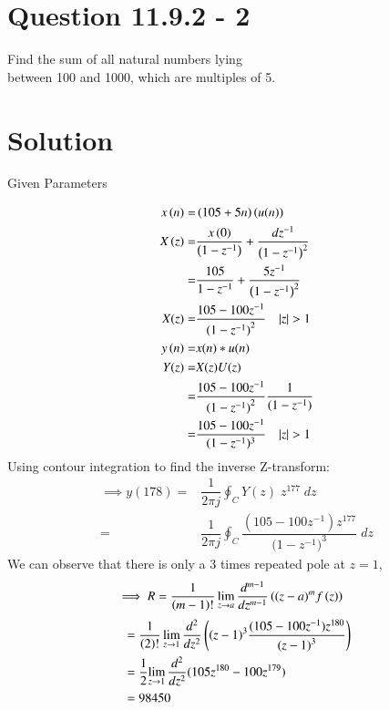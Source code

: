 \documentclass[journal,12pt,twocolumn]{IEEEtran}
\theoremstyle{remark}
\begin{document}
\section{Question 11.9.2 - 2} Find the sum of all natural numbers lying\\ between 100 and 1000, which are
multiples of 5.
\section{Solution}
\begin{table}[!h]
	\centering
	
	\vspace{6 pt}
	\caption{Given Parameters}
	\label{tab:enter-label}
\end{table}
\begin{align}
	x\brak{n}= & \brak{105+5n}\brak{u(n)}\\
X\brak{z}= &\frac {x\brak{0}} {\brak{1-z^{-1}}} + \frac {dz^{-1}} {\brak{1-z^{-1}}^2} \\
= &\dfrac{105}{1-z^{-1}} + \frac{5z^{-1}}{\brak{1-z^{-1}}^{2}}\\
X(z)=& \dfrac{105-100z^{-1}}{{(1-z^{-1})}^2} \quad |z|>1\\
y\brak{n}=& x(n)* u(n)\\
Y(z)=& X(z)U(z) \\
=& \dfrac{105-100z^{-1}}{{(1-z^{-1})}^2}\frac1 {(1-z^{-1})} \\
=& \dfrac{105-100z^{-1}}{(1-z^{-1})^{3}} \quad |z|>1
\end{align}
Using contour integration to find the inverse Z-transform:\\
\begin{align}
    \implies y(178)=&\dfrac{1}{2\pi j}\oint_{C}Y(z) \;z^{177} \;dz\\
    =&\dfrac{1}{2\pi j}\oint_{C}\dfrac{(105-100z^{-1}){z^{177}}}{({1-z^{-1})}^{3}} \;dz 
\end{align}
We can observe that there is only a 3 times repeated pole at $z=1$,
\begin{align}
    \implies R&=\dfrac{1}{\left(m-1\right)!}\lim\limits_{z\to a}\dfrac{d^{m-1}}{dz^{m-1}}\left({(z-a)}^{m}f\left(z\right)\right)  
\end{align}
\begin{align}
    &=\dfrac{1}{\left(2\right)!}\lim\limits_{z\to 1}\dfrac{d^{2}}{dz^{2}}\left({(z-1)}^{3}\dfrac{(105-100z^{-1})z^{180}}{{(z-1)}^3}\right)\\
    &=\dfrac{1}{2}{\lim\limits_{z\to 1}\dfrac{d^2}{dz^2}(105z^{180}-100z^{179})}\\
     &=98450
\end{align}
\end{document}
